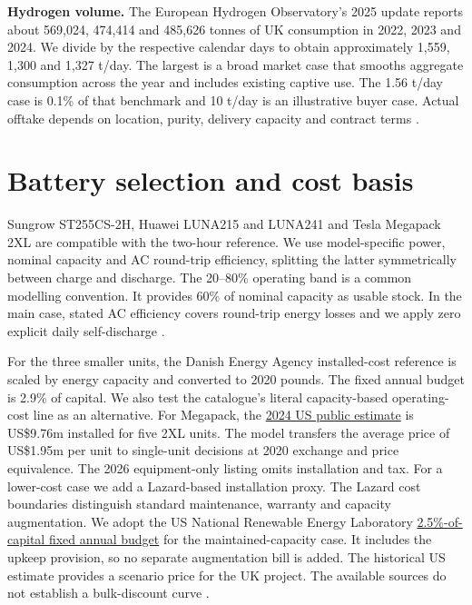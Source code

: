 \textbf{Hydrogen volume.}
The European Hydrogen Observatory's 2025 update reports about 569,024,
474,414 and 485,626 tonnes of UK consumption in 2022, 2023 and 2024.
We divide by the respective calendar days to obtain approximately
1,559, 1,300 and 1,327 t/day. The largest is a broad market case that
smooths aggregate consumption across the year and includes existing
captive use. The 1.56 t/day case is 0.1\% of that benchmark and
10 t/day is an illustrative buyer case. Actual offtake depends on
location, purity, delivery capacity and contract terms \cite{eho,v6}.

\section{Battery selection and cost basis}
Sungrow ST255CS-2H, Huawei LUNA215 and LUNA241 and Tesla Megapack
2XL are compatible with the two-hour reference. We use model-specific
power, nominal capacity and AC round-trip efficiency, splitting the latter
symmetrically between charge and discharge. The 20--80\% operating
band is a common modelling convention. It provides 60\% of nominal
capacity as usable stock. In the main case, stated AC efficiency
covers round-trip energy losses and we apply zero explicit daily
self-discharge \cite{brief,dea,v6}.

For the three smaller units, the Danish Energy Agency installed-cost
reference is scaled by energy capacity and converted to 2020 pounds.
The fixed annual budget is 2.9\% of capital. We also test the catalogue's
literal capacity-based operating-cost line as an alternative. For
Megapack, the \href{https://web.archive.org/web/20240106085048id_/https://www.tesla.com/megapack/design}{2024 US public estimate}
is US\$9.76m installed for five
2XL units. The model transfers the average price of US\$1.95m per
unit to single-unit decisions at 2020 exchange and price equivalence.
The 2026 equipment-only listing omits installation and tax. For a
lower-cost case we add a Lazard-based installation proxy. The Lazard
cost boundaries distinguish standard maintenance, warranty and capacity
augmentation. We adopt the US National Renewable Energy Laboratory
\href{https://atb.nrel.gov/electricity/2024/utility-scale_battery_storage}{2.5\%-of-capital fixed annual budget}
for the maintained-capacity case.
It includes the upkeep provision, so no separate augmentation bill is
added. The historical US estimate provides a scenario price for the
UK project. The available sources do not establish a bulk-discount
curve \cite{dea,basis,v6}.

